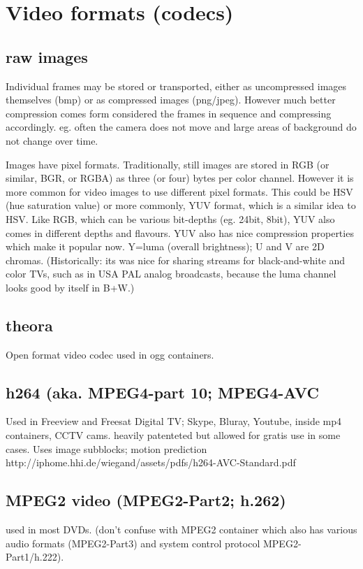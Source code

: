 \documentclass[oneside,english]{scrbook}
\begin{document}
\chapter{Video formats (codecs)}

\section{raw images}
Individual frames may be stored or transported, either as uncompressed images themselves (bmp) or as compressed images (png/jpeg). However much better compression comes form considered the frames in sequence and compressing accordingly. eg. often the camera does not move and large areas of background do not change over time.

Images have pixel formats. Traditionally, still images are stored in RGB (or similar, BGR, or RGBA) as three (or four) bytes per color channel.  However it is more common for video images to use different pixel formats.  This could be HSV (hue saturation value) or more commonly, YUV format, which is a similar idea to HSV.  Like RGB, which can be various bit-depths (eg. 24bit, 8bit), YUV also comes in different depths and flavours. YUV also has nice compression properties which make it popular now.  Y=luma (overall brightness); U and V are 2D chromas. (Historically: its was nice for sharing streams for black-and-white and color TVs, such as in USA PAL analog broadcasts, because the luma channel looks good by itself in B+W.)

\section{theora}
Open format video codec used in ogg containers.

\section{h264 (aka. MPEG4-part 10; MPEG4-AVC}
Used in Freeview and Freesat Digital TV; Skype, Bluray, Youtube, inside mp4 containers, CCTV cams.
heavily patenteted but allowed for gratis use in some cases.
Uses image subblocks;  motion prediction
http://iphome.hhi.de/wiegand/assets/pdfs/h264-AVC-Standard.pdf

\section{MPEG2 video (MPEG2-Part2; h.262)}
used in most DVDs.    (don't confuse with MPEG2 container which also has various audio formats (MPEG2-Part3) and system control protocol MPEG2-Part1/h.222).
\end{document}
